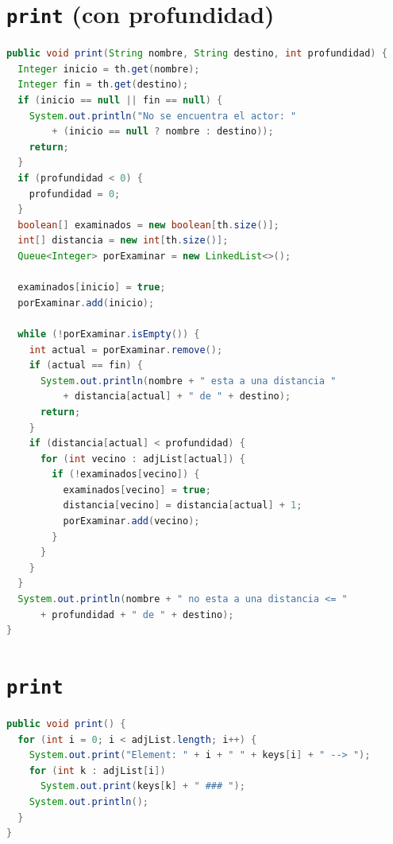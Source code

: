 \documentclass[a4paper,11pt]{report}
\begin{document}
\section{\texttt{print} (con profundidad)}
\par\noindent\begin{minipage}{\linewidth}
\begin{lstlisting}[language=Java]
public void print(String nombre, String destino, int profundidad) {
  Integer inicio = th.get(nombre);
  Integer fin = th.get(destino);
  if (inicio == null || fin == null) {
    System.out.println("No se encuentra el actor: "
        + (inicio == null ? nombre : destino));
    return;
  }
  if (profundidad < 0) {
    profundidad = 0;
  }
  boolean[] examinados = new boolean[th.size()];
  int[] distancia = new int[th.size()];
  Queue<Integer> porExaminar = new LinkedList<>();

  examinados[inicio] = true;
  porExaminar.add(inicio);

  while (!porExaminar.isEmpty()) {
    int actual = porExaminar.remove();
    if (actual == fin) {
      System.out.println(nombre + " esta a una distancia "
          + distancia[actual] + " de " + destino);
      return;
    }
    if (distancia[actual] < profundidad) {
      for (int vecino : adjList[actual]) {
        if (!examinados[vecino]) {
          examinados[vecino] = true;
          distancia[vecino] = distancia[actual] + 1;
          porExaminar.add(vecino);
        }
      }
    }
  }
  System.out.println(nombre + " no esta a una distancia <= "
      + profundidad + " de " + destino);
}
\end{lstlisting}
\end{minipage}\par

\section{\texttt{print}}
\par\noindent\begin{minipage}{\linewidth}
\begin{lstlisting}[language=Java]
public void print() {
  for (int i = 0; i < adjList.length; i++) {
    System.out.print("Element: " + i + " " + keys[i] + " --> ");
    for (int k : adjList[i])
      System.out.print(keys[k] + " ### ");
    System.out.println();
  }
}
\end{lstlisting}
\end{minipage}\par
\end{document}
